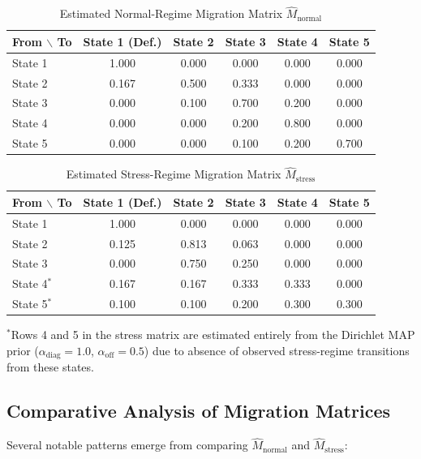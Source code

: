 \documentclass[12pt,a4paper]{article}
\begin{document}
\begin{table}[H]
\centering
\caption{Estimated Normal-Regime Migration Matrix $\hat{M}_{\text{normal}}$}
\label{tab:mnormal}
\begin{tabular}{@{}lccccc@{}}
\toprule
\textbf{From $\backslash$ To} & \textbf{State 1 (Def.)} & \textbf{State 2} & \textbf{State 3} & \textbf{State 4} & \textbf{State 5} \\
\midrule
State 1 & 1.000 & 0.000 & 0.000 & 0.000 & 0.000 \\
State 2 & 0.167 & 0.500 & 0.333 & 0.000 & 0.000 \\
State 3 & 0.000 & 0.100 & 0.700 & 0.200 & 0.000 \\
State 4 & 0.000 & 0.000 & 0.200 & 0.800 & 0.000 \\
State 5 & 0.000 & 0.000 & 0.100 & 0.200 & 0.700 \\
\bottomrule
\end{tabular}
\end{table}

\begin{table}[H]
\centering
\caption{Estimated Stress-Regime Migration Matrix $\hat{M}_{\text{stress}}$}
\label{tab:mstress}
\begin{tabular}{@{}lccccc@{}}
\toprule
\textbf{From $\backslash$ To} & \textbf{State 1 (Def.)} & \textbf{State 2} & \textbf{State 3} & \textbf{State 4} & \textbf{State 5} \\
\midrule
State 1 & 1.000 & 0.000 & 0.000 & 0.000 & 0.000 \\
State 2 & 0.125 & 0.813 & 0.063 & 0.000 & 0.000 \\
State 3 & 0.000 & 0.750 & 0.250 & 0.000 & 0.000 \\
State 4$^*$ & 0.167 & 0.167 & 0.333 & 0.333 & 0.000 \\
State 5$^*$ & 0.100 & 0.100 & 0.200 & 0.300 & 0.300 \\
\bottomrule
\end{tabular}
\end{table}
{\footnotesize $^*$Rows 4 and 5 in the stress matrix are estimated entirely from the Dirichlet MAP prior ($\alpha_{\text{diag}} = 1.0$, $\alpha_{\text{off}} = 0.5$) due to absence of observed stress-regime transitions from these states.}

\subsection{Comparative Analysis of Migration Matrices}

Several notable patterns emerge from comparing $\hat{M}_{\text{normal}}$ and $\hat{M}_{\text{stress}}$:
\end{document}
